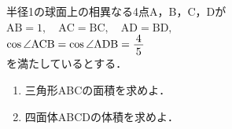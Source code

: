 ﻿\documentclass[../../../uem_tok_q.tex]{subfiles}
\begin{document}
    半径1の球面上の相異なる4点A，B，C，Dが\\
    \hspace{3\zw}%
    $\displaystyle%
        \mathrm{AB}=1,\quad \mathrm{AC}=\mathrm{BC},\quad \mathrm{AD}=\mathrm{BD},%
    $\\
    \hspace{3\zw}%
    $\displaystyle%
        \cos\angle\mathrm{ACB}=\cos\angle\mathrm{ADB}=\myfraca{4}{5}%
    $\\
    を満たしているとする．

    \begin{enumerate}
        \item 三角形ABCの面積を求めよ．
        \item 四面体ABCDの体積を求めよ．
    \end{enumerate}
\end{document}

